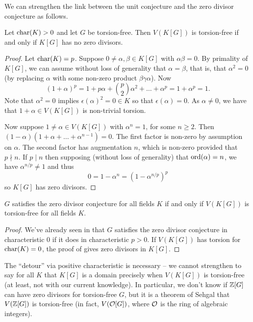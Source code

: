 We can strengthen the link between the unit conjecture and the zero divisor conjecture as follows.

\begin{proposition}
    \label{proposition:zd_and_torsion_units}
    Let $\mathrm{char}(K) > 0$ and let $G$ be torsion-free.
    Then $V(K[G])$ is torsion-free if and only if $K[G]$ has no zero divisors.
\end{proposition}

\begin{proof}
    Let $\mathrm{char}(K) = p$.
    Suppose $0 \neq \alpha, \beta \in K[G]$ with $\alpha \beta = 0$.
    By primality of $K[G]$, we can assume without loss of generality that $\alpha = \beta$, that is, that $\alpha^2 = 0$ (by replacing $\alpha$ with some non-zero product $\beta \gamma \alpha$).
    Now \[
        (1 + \alpha)^p = 1 + p \alpha + \binom{p}{2} \alpha^2 + \dots + \alpha^p = 1 + \alpha^p = 1.
    \]
    Note that $\alpha^2 = 0$ implies $\epsilon(\alpha)^2 = 0 \in K$ so that $\epsilon(\alpha) = 0$.
    As $\alpha \neq 0$, we have that $1 + \alpha \in V(K[G])$ is non-trivial torsion.

    Now suppose $1 \neq \alpha \in V(K[G])$ with $\alpha^n = 1$, for some $n \geq 2$.
    Then $(1 - \alpha)(1 + \alpha + \dots + \alpha^{n-1}) = 0$.
    The first factor is non-zero by assumption on $\alpha$.
    The second factor has augmentation $n$, which is non-zero provided that $p \nmid n$.
    If $p \mid n$ then supposing (without loss of generality) that $\mathrm{ord}(\alpha) = n$, we have $\alpha^{n / p} \neq 1$ and thus \[
        0 = 1 - \alpha^n = (1 - \alpha^{n/p})^p
    \] so $K[G]$ has zero divisors.
\end{proof}

\begin{corollary}
    \label{corollary:zd_units_all_K}
    $G$ satisfies the zero divisor conjecture for all fields $K$ if and only if $V(K[G])$ is torsion-free for all fields $K$.
\end{corollary}

\begin{proof}
    We've already seen in  that $G$ satisfies the zero divisor conjecture in characteristic $0$ if it does in characteristic $p > 0$.
    If $V(K[G])$ has torsion for $\mathrm{char}(K) = 0$, the proof of  gives zero divisors in $K[G]$.
\end{proof}

\begin{remark}
    The ``detour'' via positive characteristic is necessary -- we cannot strengthen  to say for all $K$ that $K[G]$ is a domain precisely when $V(K[G])$ is torsion-free (at least, not with our current knowledge).
    In particular, we don't know if $\mathbb{Z}[G]$ can have zero divisors for torsion-free $G$, but it is a theorem of Sehgal that $V(\mathbb{Z}[G])$ is torsion-free (in fact, $V(\mathcal{O}[G])$, where $\mathcal{O}$ is the ring of algebraic integers).
\end{remark}

